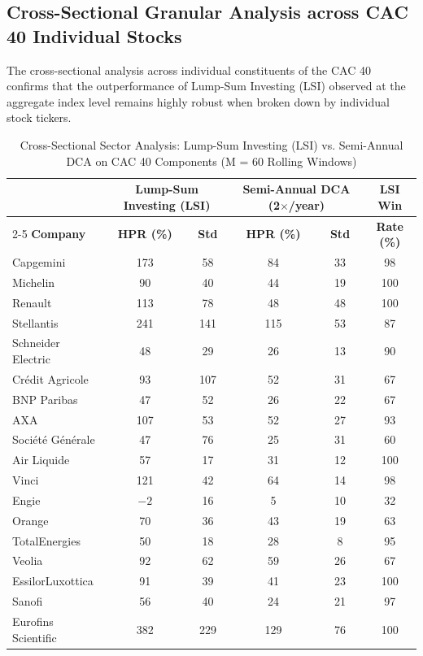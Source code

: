 \documentclass[11pt,a4paper]{article}
\begin{document}
\subsection{Cross-Sectional Granular Analysis across CAC 40 Individual Stocks}

The cross-sectional analysis across individual constituents of the CAC 40 confirms that the outperformance of Lump-Sum Investing (LSI) observed at the aggregate index level remains highly robust when broken down by individual stock tickers.

\begin{table}[H]
\centering
\caption{Cross-Sectional Sector Analysis: Lump-Sum Investing (LSI) vs. Semi-Annual DCA on CAC
40 Components (M = 60 Rolling Windows)}
\label{tab:lsi_vs_dca_sectors}
\small
\begin{tabularx}{\textwidth}{X c c c c c}
\hline
 & \multicolumn{2}{c}{\textbf{Lump-Sum Investing (LSI)}} & \multicolumn{2}{c}{\textbf{Semi-Annual DCA (2$\times$/year)}} & \textbf{LSI Win} \\
\cline{2-5}
\textbf{Company} & \textbf{HPR (\%)} & \textbf{Std} & \textbf{HPR (\%)} & \textbf{Std} & \textbf{Rate (\%)} \\
\hline
Capgemini & 173 & 58 & 84 & 33 & 98 \\
Michelin & 90 & 40 & 44 & 19 & 100 \\
Renault & 113 & 78 & 48 & 48 & 100 \\
Stellantis & 241 & 141 & 115 & 53 & 87 \\
Schneider Electric & 48 & 29 & 26 & 13 & 90 \\
Crédit Agricole & 93 & 107 & 52 & 31 & 67 \\
BNP Paribas & 47 & 52 & 26 & 22 & 67 \\
AXA & 107 & 53 & 52 & 27 & 93 \\
Société Générale & 47 & 76 & 25 & 31 & 60 \\
Air Liquide & 57 & 17 & 31 & 12 & 100 \\
Vinci & 121 & 42 & 64 & 14 & 98 \\
Engie & $-2$ & 16 & 5 & 10 & 32 \\
Orange & 70 & 36 & 43 & 19 & 63 \\
TotalEnergies & 50 & 18 & 28 & 8 & 95 \\
Veolia & 92 & 62 & 59 & 26 & 67 \\
EssilorLuxottica & 91 & 39 & 41 & 23 & 100 \\
Sanofi & 56 & 40 & 24 & 21 & 97 \\
Eurofins Scientific & 382 & 229 & 129 & 76 & 100 \\

\end{tabularx}
\end{table}
\end{document}
